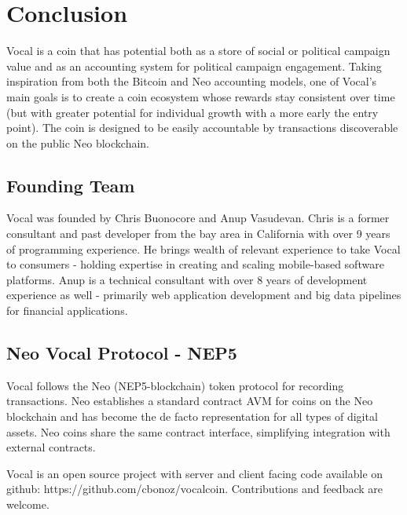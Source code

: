 \documentclass[conference]{IEEEtran}
\begin{document}
    \FloatBarrier
    \section{Conclusion}
   Vocal is a coin that has potential both as a store of social or political campaign value and as an accounting system for political campaign engagement. Taking inspiration from both the Bitcoin and Neo accounting models, one of Vocal's main goals is to create a coin ecosystem whose rewards stay consistent over time (but with greater potential for individual growth with a more early the entry point). The coin is designed to be easily accountable by transactions discoverable on the public Neo blockchain.

    \subsection{Founding Team}
   Vocal was founded by Chris Buonocore and Anup Vasudevan. Chris is a former consultant and past developer from the bay area in California with over 9 years of programming experience.
   He brings wealth of relevant experience to take Vocal to consumers - holding expertise in creating and scaling mobile-based software platforms. Anup is a technical consultant with over 8
   years of development experience as well - primarily web application development and big data pipelines for financial applications.

    \subsection{Neo Vocal Protocol - NEP5}
   Vocal follows the Neo (NEP5-blockchain) token protocol for recording transactions.
    Neo establishes a standard contract AVM for coins on the Neo blockchain and has become the de facto representation for all types of digital assets. Neo coins share the same contract interface, simplifying integration with external contracts.

    Vocal is an open source project with server and client facing code available on github: https://github.com/cbonoz/vocalcoin. Contributions and feedback are welcome.

    \printbibliography
   
    
\end{document}
